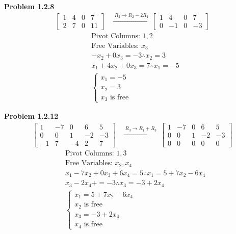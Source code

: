 \documentclass[12pt]{article}
\begin{document}
\textbf{Problem 1.2.8} \begin{align*}
    \begin{bmatrix}
        1 & 4 & 0 & 7 \\
        2 & 7 & 0 & 11
    \end{bmatrix}
    & \xrightarrow{\; R_2 \to R_2 - 2R_1 \;}
    \begin{bmatrix}
        1 & 4 & 0 & 7 \\
        0 & -1 & 0 & -3
    \end{bmatrix}
\end{align*} \begin{align*}
    & \text{Pivot Columns: } 1, 2 \\[6pt]
    & \text{Free Variables: } x_3 \\[6pt]
    & -x_2 + 0x_3 = -3 \therefore x_2 = 3 \\[6pt]
    & x_1 + 4x_2 + 0x_3 = 7 \therefore x_1 = -5 \\[6pt]
    & \boxed{\begin{cases}
        x_1 = -5 \\
        x_2 = 3 \\
        x_3 \text{ is free}
    \end{cases}}
\end{align*}

\newpage

\textbf{Problem 1.2.12} \begin{align*}
    \begin{bmatrix}
        1 & -7 & 0 & 6 & 5 \\
        0 & 0 & 1 & -2 & -3 \\
        -1 & 7 & -4 & 2 & 7
    \end{bmatrix}
    & \xrightarrow{\; R_3 \to R_1 + R_3 \;} 
    \begin{bmatrix}
        1 & -7 & 0 & 6 & 5 \\
        0 & 0 & 1 & -2 & -3 \\
        0 & 0 & 0 & 0 & 0
    \end{bmatrix}
\end{align*} \begin{align*}
    & \text{Pivot Columns: } 1, 3 \\[6pt]
    & \text{Free Variables: } x_2, x_4 \\[6pt]
    & x_1 - 7x_2 + 0x_3 + 6x_4 = 5 \therefore x_1 = 5 + 7x_2 - 6x_4 \\[6pt]
    & x_3 - 2x_4 + = -3 \therefore x_3 = -3 + 2x_4 \\[6pt]
    & \boxed{\begin{cases}
        x_1 = 5 + 7x_2 - 6x_4 \\
        x_2 \text{ is free} \\
        x_3 = -3 + 2x_4 \\
        x_4 \text{ is free}
    \end{cases}}
\end{align*}
\end{document}
